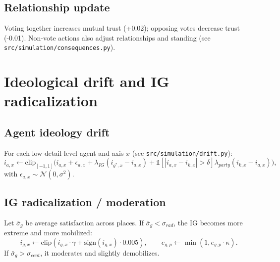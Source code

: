 \documentclass[11pt]{article}
\begin{document}
\subsection{Relationship update}
Voting together increases mutual trust (+0.02); opposing votes decrease trust (-0.01).
Non-vote actions also adjust relationships and standing (see \texttt{src/simulation/consequences.py}).

\section{Ideological drift and IG radicalization}
\begin{center}
\end{center}

\subsection{Agent ideology drift}
For each low-detail-level agent and axis $x$ (see \texttt{src/simulation/drift.py}):
\[
  i_{a,x}\leftarrow \mathrm{clip}_{[-1,1]}\Big(
  i_{a,x} + \epsilon_{a,x}
  + \lambda_{IG}(i_{g^*,x}-i_{a,x})
  + \mathbb{1}[|i_{a,x}-i_{k,x}|>\delta]\lambda_{party}(i_{k,x}-i_{a,x})
  \Big),
\]
with $\epsilon_{a,x}\sim\mathcal{N}(0,\sigma^2)$.

\subsection{IG radicalization / moderation}
Let $\bar{\sigma}_g$ be average satisfaction across places.
If $\bar{\sigma}_g < \sigma_{rad}$, the IG becomes more extreme and more mobilized:
\[
  i_{g,x}\leftarrow \mathrm{clip}(i_{g,x}\cdot \gamma + \mathrm{sign}(i_{g,x})\cdot 0.005),\qquad
  e_{g,p}\leftarrow \min(1, e_{g,p}\cdot \kappa).
\]
If $\bar{\sigma}_g > \sigma_{cent}$, it moderates and slightly demobilizes.
\end{document}
